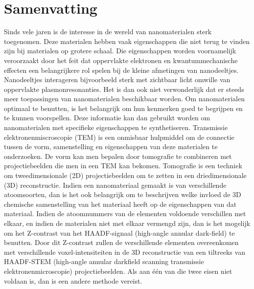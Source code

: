\documentclass{report}
\begin{document}
\chapter*{Samenvatting}
Sinds vele jaren is de interesse in de wereld van nanomaterialen sterk toegenomen. Deze materialen hebben vaak eigenschappen die niet terug te vinden zijn bij materialen op grotere schaal. Die eigenschappen worden voornamelijk veroorzaakt door het feit dat oppervlakte elektronen en kwantummechanische effecten een belangrijkere rol spelen bij de kleine afmetingen van nanodeeltjes. Nanodeeltjes interageren bijvoorbeeld sterk met zichtbaar licht omwille van oppervlakte plasmonresonanties. Het is dan ook niet verwonderlijk dat er steeds meer toepassingen van nanomaterialen beschikbaar worden. Om nanomaterialen optimaal te benutten, is het belangrijk om hun kenmerken goed te begrijpen en te kunnen voorspellen. Deze informatie kan dan gebruikt worden om nanomaterialen met specifieke eigenschappen te synthetiseren. Transmissie elektronenmiscroscopie (TEM) is een onmisbaar hulpmiddel om de connectie tussen de vorm, samenstelling en eigenschappen van deze materialen te onderzoeken. De vorm kan men bepalen door tomografie te combineren met projectiebeelden die men in een TEM kan bekomen. Tomografie is een techniek om tweedimensionale (2D) projectiebeelden om te zetten in een driedimensionale (3D) reconstructie. Indien een nanomateriaal gemaakt is van verschillende atoomsoorten, dan is het ook belangrijk om te beschrijven welke invloed de 3D chemische samenstelling van het materiaal heeft op de eigenschappen van dat materiaal. Indien de atoomnummers van de elementen voldoende verschillen met elkaar, en indien de materialen niet met elkaar vermengd zijn, dan is het mogelijk om het Z-contrast van het HAADF-signaal (high-angle annular dark-field) te benutten. Door dit Z-contrast zullen de verschillende elementen overeenkomen met verschillende voxel-intensiteiten in de 3D reconstructie van een tiltreeks van HAADF-STEM (high-angle annular darkfield scanning transmissie elektronenmicroscopie) projectiebeelden. Als aan één van die twee eisen niet voldaan is, dan is een andere methode vereist.
\\ \\
\end{document}
